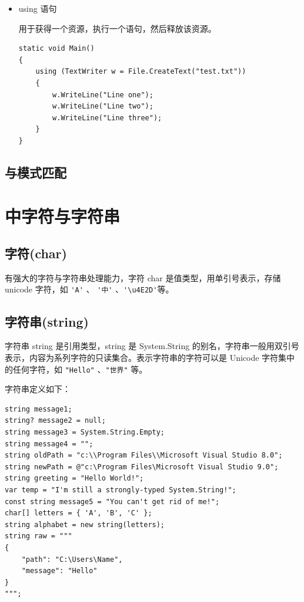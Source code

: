 \begin{itemize}
          \begin{lstlisting}
class Account
{
    decimal balance;
    public void Withdraw(decimal amount)
    {
        lock (this)
        {
            if (amount > balance)
            {
                throw new Exception("Insufficient funds");
            }
            balance -= amount;
        }
    }
}
\end{lstlisting}

    \item using 语句

          用于获得一个资源，执行一个语句，然后释放该资源。

          \begin{lstlisting}
static void Main()
{
    using (TextWriter w = File.CreateText("test.txt"))
    {
        w.WriteLine("Line one");
        w.WriteLine("Line two");
        w.WriteLine("Line three");
    }
}
\end{lstlisting}

\end{itemize}


\subsection{与模式匹配}






\section{\cs 中字符与字符串}

\subsection{字符(char)}

\cs 有强大的字符与字符串处理能力，字符 char 是值类型，用单引号表示，存储 unicode 字符，如
\verb|'A'| 、 \verb|'中'| 、\verb|'\u4E2D'|等。

\subsection{字符串(string)}
字符串 string 是引用类型，string 是 System.String 的别名，字符串一般用双引号表示，内容为系列字符的只读集合。表示字符串的字符可以是 Unicode 字符集中的任何字符，如 \verb|"Hello"| 、\verb|"世界"| 等。

字符串定义如下：

\begin{lstlisting}
string message1;
string? message2 = null;
string message3 = System.String.Empty;
string message4 = "";
string oldPath = "c:\\Program Files\\Microsoft Visual Studio 8.0";
string newPath = @"c:\Program Files\Microsoft Visual Studio 9.0";
string greeting = "Hello World!";
var temp = "I'm still a strongly-typed System.String!";
const string message5 = "You can't get rid of me!";
char[] letters = { 'A', 'B', 'C' };
string alphabet = new string(letters);
string raw = """
{
    "path": "C:\Users\Name",
    "message": "Hello"
}
""";
\end{lstlisting}

